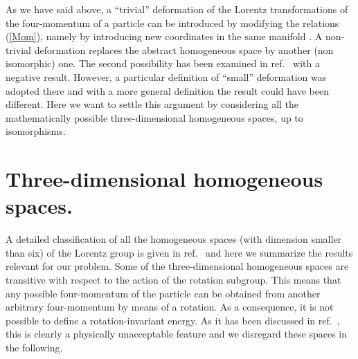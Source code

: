 \documentclass[a4paper,12pt]{article}
\begin{document}
As we have said above, a ``trivial'' deformation of the Lorentz transformations of the four-momentum of a particle can be introduced by modifying the relations (\ref{Mom}), namely by introducing new coordinates in the same manifold \myHighlight{$\Pi$}\coordHE{}. A non-trivial deformation replaces the abstract homogeneous space \myHighlight{$\Pi$}\coordHE{} by another (non isomorphic) one. The second possibility has been examined in ref.\ \cite{Toller} with a negative result. However, a particular definition of ``small'' deformation was adopted there and with a more general definition the result could have been different. Here we want to settle this argument by considering all the mathematically possible three-dimensional homogeneous spaces, up to isomorphisms.

\section{Three-dimensional homogeneous spaces.}

 A detailed classification of all the homogeneous spaces (with dimension smaller than six) of the Lorentz group is given in ref.\ \cite{Toller1} and here we summarize the results relevant for our problem. Some of the three-dimensional homogeneous spaces are transitive with respect to the action of the rotation subgroup. This means that any possible four-momentum of the particle can be obtained from another arbitrary four-momentum by means of a rotation. As a consequence, it is not possible to define a rotation-invariant energy. As it has been discussed in ref.\ \cite{Toller}, this is clearly a physically unacceptable feature and we disregard these spaces in the following. 
\end{document}
